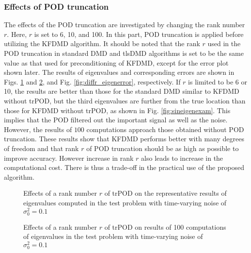 \documentclass[aip,graphicx]{revtex4-1}
\begin{document}
\subsubsection{Effects of POD truncation}
\label{sec:EPT}
The effects of the POD truncation are investigated by changing the rank number $r$. Here, $r$ is set to 6, 10, and 100. In this part, POD truncation is applied before utilizing the KFDMD algorithm. It should be noted that the rank $r$ used in the POD truncation in standard DMD and tlsDMD algorithms is set to be the same value as that used for preconditioning of KFDMD, except for the error plot shown later. The results of eigenvalues and corresponding errors are shown in Figs. \ref{fig:diffr_eigenexam} and \ref{fig:diffr_eigen}, and Fig. \ref{fig:diffr_eigenerror}, respectively. If $r$ is limited to be 6 or 10, the results are better than those for the standard DMD similar to KFDMD without trPOD, but the third eigenvalues are further from the true location than those for KFDMD without trPOD, as shown in Fig. \ref{fig:sineigenexam}. This implies that the POD filtered out the important signal as well as the noise. However, the results of $100$ computations approach those obtained without POD truncation. These results show that KFDMD performs better with many degrees of freedom and that rank $r$ of POD truncation should be as high as possible to improve accuracy. However increase in rank $r$ also leads to increase in the computational cost. There is thus a trade-off in the practical use of the proposed algorithm. 



\begin{figure}
	    \caption{Effects of a rank number $r$ of trPOD on the representative results of eigenvalues computed in the test problem with time-varying noise of $\sigma_0^2=0.1$}	
	\label{fig:diffr_eigenexam}
\end{figure}

\begin{figure}
	\caption{Effects of a rank number $r$ of trPOD on  results of 100 computations of eigenvalues in the test problem with time-varying noise of $\sigma_0^2=0.1$}	
	\label{fig:diffr_eigen}
\end{figure}
\end{document}
